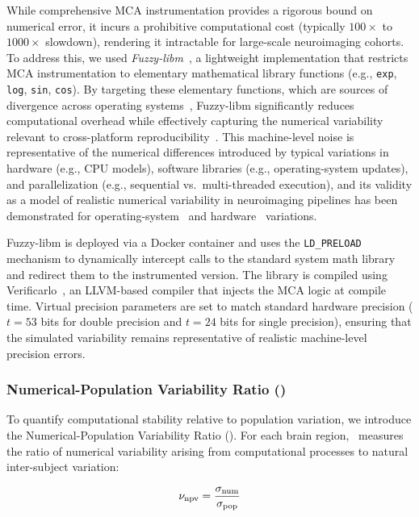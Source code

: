 While comprehensive MCA instrumentation provides a rigorous bound on numerical
error, it incurs a prohibitive computational cost (typically $100\times$ to
$1000\times$ slowdown), rendering it intractable for large-scale neuroimaging
cohorts. To address this, we used
\textit{Fuzzy-libm}~\cite{salari2021accurate}, a lightweight implementation
that restricts MCA instrumentation to elementary mathematical library functions
(e.g., \texttt{exp}, \texttt{log}, \texttt{sin}, \texttt{cos}). By targeting
these elementary functions, which are sources of divergence across operating
systems~\cite{glatard2015reproducibility}, Fuzzy-libm significantly reduces
computational overhead while effectively capturing the numerical variability
relevant to cross-platform
reproducibility~\cite{salari2021accurate,vila2024impact,des2023reproducibility}.
This machine-level noise is representative of the numerical differences
introduced by typical variations in hardware (e.g., CPU models), software
libraries (e.g., operating-system updates), and parallelization (e.g.,
sequential vs.\ multi-threaded execution), and its validity as a model of
realistic numerical variability in neuroimaging pipelines has been demonstrated
for operating-system~\cite{salari2021accurate} and
hardware~\cite{vila2024impact} variations.

Fuzzy-libm is deployed via a Docker container and uses the \texttt{LD\_PRELOAD}
mechanism to dynamically intercept calls to the standard system math library
and redirect them to the instrumented version. The library is compiled using
Verificarlo~\cite{denis2016verificarlo}, an LLVM-based compiler that injects
the MCA logic at compile time. Virtual precision parameters are set to match
standard hardware precision ($t=53$ bits for double precision and $t=24$ bits
for single precision), ensuring that the simulated variability remains
representative of realistic machine-level precision errors.

\subsubsection{Numerical-Population Variability Ratio (\npvr)}

To quantify computational stability relative to population variation, we
introduce the Numerical-Population Variability Ratio (\npvr). For each brain
region, \npvr\ measures the ratio of numerical variability arising from
computational processes to natural inter-subject variation:

\[
    \text{$\nu_{\mathrm{npv}}$} = \frac{\sigma_{\mathrm{num}}}{\sigma_{\mathrm{pop}}}
\]

